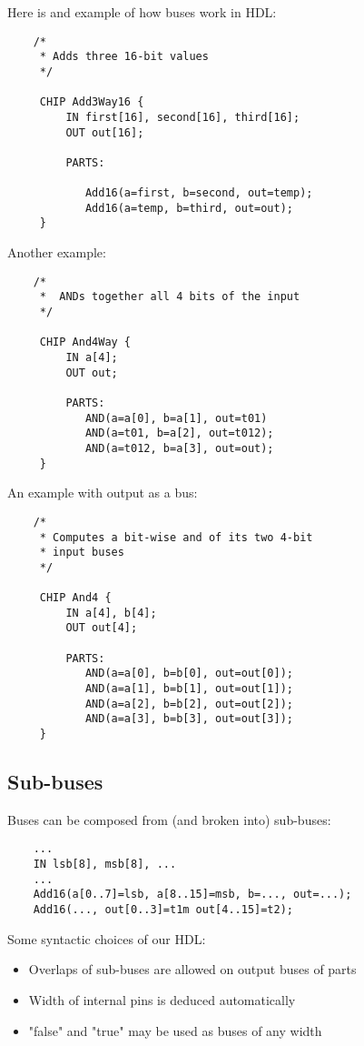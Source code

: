 Here is and example of how buses work in HDL:

\begin{lstlisting}
    /*
     * Adds three 16-bit values
     */

     CHIP Add3Way16 {
         IN first[16], second[16], third[16];
         OUT out[16];

         PARTS:

            Add16(a=first, b=second, out=temp);
            Add16(a=temp, b=third, out=out);
     }
\end{lstlisting}

Another example:

\begin{lstlisting}
    /*
     *  ANDs together all 4 bits of the input
     */

     CHIP And4Way {
         IN a[4];
         OUT out;

         PARTS:
            AND(a=a[0], b=a[1], out=t01)
            AND(a=t01, b=a[2], out=t012);
            AND(a=t012, b=a[3], out=out);
     }
\end{lstlisting}

An example with output as a bus:

\begin{lstlisting}
    /*
     * Computes a bit-wise and of its two 4-bit
     * input buses
     */

     CHIP And4 {
         IN a[4], b[4];
         OUT out[4];

         PARTS:
            AND(a=a[0], b=b[0], out=out[0]);
            AND(a=a[1], b=b[1], out=out[1]);
            AND(a=a[2], b=b[2], out=out[2]);
            AND(a=a[3], b=b[3], out=out[3]);
     }
\end{lstlisting}

\subsection{Sub-buses}

Buses can be composed from (and broken into) sub-buses:

\begin{lstlisting}
    ...
    IN lsb[8], msb[8], ...
    ...
    Add16(a[0..7]=lsb, a[8..15]=msb, b=..., out=...);
    Add16(..., out[0..3]=t1m out[4..15]=t2);
\end{lstlisting}

Some syntactic choices of our HDL:

\begin{itemize}
    \item Overlaps of sub-buses are allowed on output buses of parts
    \item Width of internal pins is deduced automatically
    \item "false" and "true" may be used as buses of any width
\end{itemize}
